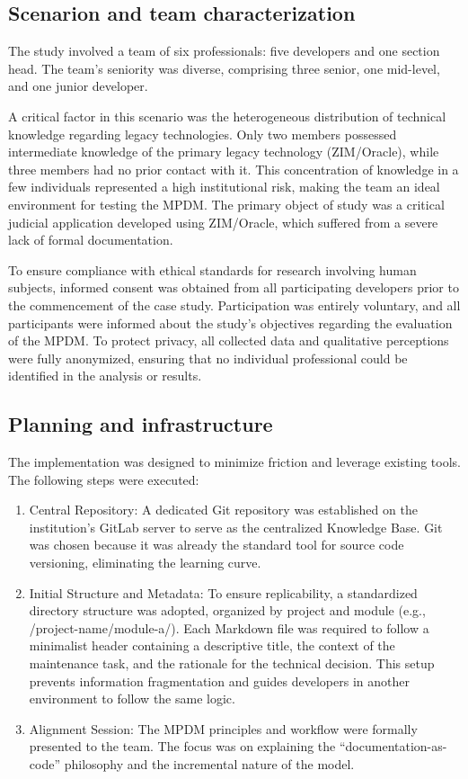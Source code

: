 \documentclass{ieeeaccess}
\begin{document}
\subsection{Scenarion and team characterization}
The study involved a team of six professionals: five developers and one section head. The team's seniority was diverse, comprising three senior, one mid-level, and one junior developer.

A critical factor in this scenario was the heterogeneous distribution of technical knowledge regarding legacy technologies. Only two members possessed intermediate knowledge of the primary legacy technology (ZIM/Oracle), while three members had no prior contact with it. This concentration of knowledge in a few individuals represented a high institutional risk, making the team an ideal environment for testing the MPDM. The primary object of study was a critical judicial application developed using ZIM/Oracle, which suffered from a severe lack of formal documentation.

To ensure compliance with ethical standards for research involving human subjects, informed consent was obtained from all participating developers prior to the commencement of the case study. Participation was entirely voluntary, and all participants were informed about the study's objectives regarding the evaluation of the MPDM. To protect privacy, all collected data and qualitative perceptions were fully anonymized, ensuring that no individual professional could be identified in the analysis or results.

\subsection{Planning and infrastructure}
The implementation was designed to minimize friction and leverage existing tools. The following steps were executed:
\begin{enumerate}
    \item Central Repository: A dedicated Git repository was established on the institution's GitLab server to serve as the centralized Knowledge Base. Git was chosen because it was already the standard tool for source code versioning, eliminating the learning curve.
    \item Initial Structure and Metadata: To ensure replicability, a standardized directory structure was adopted, organized by project and module (e.g., /project-name/module-a/). Each Markdown file was required to follow a minimalist header containing a descriptive title, the context of the maintenance task, and the rationale for the technical decision. This setup prevents information fragmentation and guides developers in another environment to follow the same logic.
    \item Alignment Session: The MPDM principles and workflow were formally presented to the team. The focus was on explaining the ``documentation-as-code'' philosophy and the incremental nature of the model.
\end{enumerate}
\end{document}
